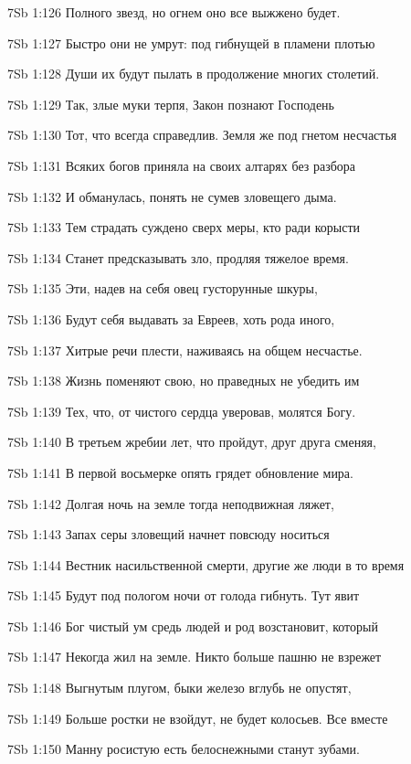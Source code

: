 \vs 7Sb 1:126 Полного звезд, но огнем оно все выжжено будет. 

\vs 7Sb 1:127 Быстро они не умрут: под гибнущей в пламени плотью 

\vs 7Sb 1:128 Души их будут пылать в продолжение многих столетий. 

\vs 7Sb 1:129 Так, злые муки терпя, Закон познают Господень  

\vs 7Sb 1:130 Тот, что всегда справедлив. Земля же под гнетом несчастья

\vs 7Sb 1:131 Всяких богов приняла на своих алтарях без разбора 

\vs 7Sb 1:132 И обманулась, понять не сумев зловещего дыма. 

\vs 7Sb 1:133 Тем страдать суждено сверх меры, кто ради корысти 

\vs 7Sb 1:134 Станет предсказывать зло, продляя тяжелое время. 

\vs 7Sb 1:135 Эти, надев на себя овец густорунные шкуры,

\vs 7Sb 1:136 Будут себя выдавать за Евреев, хоть рода иного, 

\vs 7Sb 1:137 Хитрые речи плести, наживаясь на общем несчастье. 

\vs 7Sb 1:138 Жизнь поменяют свою, но праведных не убедить им  

\vs 7Sb 1:139 Тех, что, от чистого сердца уверовав, молятся Богу.

\vs 7Sb 1:140 В третьем жребии лет, что пройдут, друг друга сменяя,

\vs 7Sb 1:141 В первой восьмерке опять грядет обновление мира. 

\vs 7Sb 1:142 Долгая ночь на земле тогда неподвижная ляжет, 

\vs 7Sb 1:143 Запах серы зловещий начнет повсюду носиться  

\vs 7Sb 1:144 Вестник насильственной смерти, другие же люди в то время 

\vs 7Sb 1:145 Будут под пологом ночи от голода гибнуть. Тут явит

\vs 7Sb 1:146 Бог чистый ум средь людей и род возстановит, который 

\vs 7Sb 1:147 Некогда жил на земле. Никто больше пашню не взрежет 

\vs 7Sb 1:148 Выгнутым плугом, быки железо вглубь не опустят, 

\vs 7Sb 1:149 Больше ростки не взойдут, не будет колосьев. Все вместе 

\vs 7Sb 1:150 Манну росистую есть белоснежными станут зубами.

